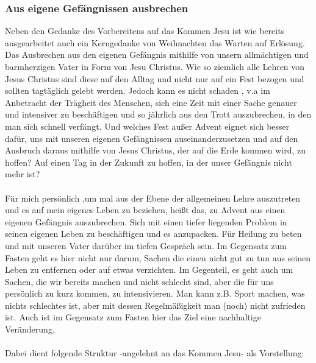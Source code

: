 \subsubsection*{Aus eigene Gefängnissen ausbrechen}
Neben den Gedanke des Vorbereitens auf das Kommen Jesu ist wie bereits ausgearbeitet auch ein Kerngedanke von Weihnachten das Warten auf Erlösung. Das Ausbrechen aus den eigenen Gefängnis mithilfe von unsern allmächtigen und barmherzigen Vater in Form von Jesu Christus. Wie so ziemlich alle Lehren von Jesus Christus sind diese auf den Alltag und nicht nur auf ein Fest bezogen und sollten tagtäglich gelebt werden. Jedoch kann es nicht schaden , v.a im Anbetracht der Trägheit des Menschen, sich eine Zeit mit einer Sache genauer und intensiver zu beschäftigen und so jährlich aus den Trott auszubrechen, in den man sich schnell verfängt. Und welches Fest außer Advent eignet sich besser dafür, uns mit unseren eigenen Gefängnissen auseinanderzusetzen und auf den Ausbruch daraus mithilfe von Jesus Christus, der auf die Erde kommen wird, zu hoffen? Auf einen Tag in der Zukunft zu hoffen, in der unser Gefängnis nicht mehr ist?
\\~\\
Für mich persönlich ,um mal aus der Ebene der allgemeinen Lehre auszutreten und es auf mein eigenes Leben zu beziehen, heißt das, zu Advent aus einen eigenen Gefängnis auszubrechen. Sich mit einen tiefer liegenden Problem in seinen eigenen Leben zu beschäftigen und es anzupacken. Für Heilung zu beten und mit unseren Vater darüber im tiefen Gespräch sein. Im Gegensatz zum Fasten geht es hier nicht nur darum, Sachen die einen nicht gut zu tun aus seinen Leben zu entfernen oder auf etwas verzichten. Im Gegenteil, es geht auch um Sachen, die wir bereits machen und nicht schlecht sind, aber die für uns persönlich zu kurz kommen, zu intensivieren. Man kann z.B. Sport machen, was nichts schlechtes ist, aber mit dessen Regelmäßigkeit man (noch) nicht zufrieden ist. Auch ist im Gegensatz zum Fasten hier das Ziel eine nachhaltige Veränderung.
\\~\\
Dabei dient folgende Struktur -angelehnt an das Kommen Jesu- als Vorstellung:
